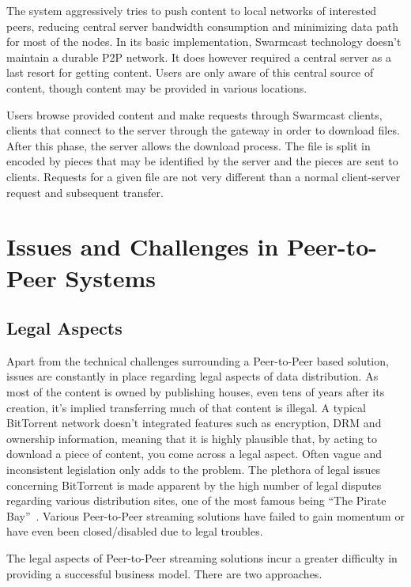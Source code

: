 The system aggressively tries to push content to local networks of interested
peers, reducing central server bandwidth consumption and minimizing data path
for most of the nodes. In its basic implementation, Swarmcast technology
doesn't maintain a durable P2P network. It does however required a central
server as a last resort for getting content. Users are only aware of this
central source of content, though content may be provided in various
locations.

Users browse provided content and make requests through Swarmcast clients,
clients that connect to the server through the gateway in order to download
files. After this phase, the server allows the download process. The file is
split in encoded by pieces that may be identified by the server and the pieces
are sent to clients. Requests for a given file are not very different than
a normal client-server request and subsequent transfer.

\section{Issues and Challenges in Peer-to-Peer Systems}
\label{sec:p2p-systems:issues}

\subsection{Legal Aspects}
\label{subsec:p2p-streaming-legal}

Apart from the technical challenges surrounding a Peer-to-Peer based solution,
issues are constantly in place regarding legal aspects of data distribution.
As most of the content is owned by publishing houses, even tens of years after
its creation, it's implied transferring much of that content is illegal. A
typical BitTorrent network doesn't integrated features such as encryption, DRM
and ownership information, meaning that it is highly plausible that, by acting
to download a piece of content, you come across a legal aspect. Often vague
and inconsistent legislation only adds to the problem. The plethora of legal
issues concerning BitTorrent is made apparent by the high number of legal
disputes regarding various distribution sites, one of the most famous being
``The Pirate Bay''~\cite{pirate-bay}. Various Peer-to-Peer streaming solutions
have failed to gain momentum or have even been closed/disabled due to legal
troubles.

The legal aspects of Peer-to-Peer streaming solutions incur a greater
difficulty in providing a successful business model. There are two approaches.

